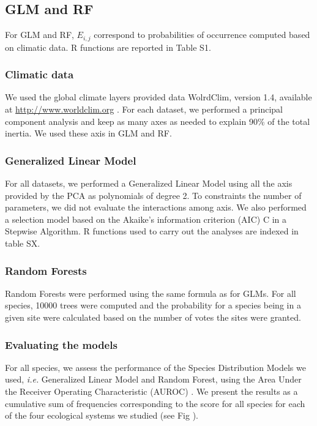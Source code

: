 \subsection{GLM and RF}\label{glm-and-rf}

For GLM and RF, \(E_{i,j}\) correspond to probabilities of occurrence
computed based on climatic data. R functions are reported in Table S1.

\subsubsection{Climatic data}\label{climatic-data}

We used the global climate layers provided data WolrdClim, version 1.4,
available at \url{http://www.worldclim.org} \citep{Hijmans2005}. For
each dataset, we performed a principal component analysis and keep as
many axes as needed to explain 90\% of the total inertia. We used these
axis in GLM and RF.

\subsubsection{Generalized Linear Model}\label{generalized-linear-model}

For all datasets, we performed a Generalized Linear Model
\citep{Elith2006} using all the axis provided by the PCA as polynomials
of degree 2. To constraints the number of parameters, we did not
evaluate the interactions among axis. We also performed a selection
model based on the Akaike's information criterion (AIC) C in a Stepwise
Algorithm. R functions used to carry out the analyses are indexed in
table SX.

\subsubsection{Random Forests}\label{random-forests}

Random Forests \citep{Prasad2006} were performed using the same formula
as for GLMs. For all species, 10000 trees were computed and the
probability for a species being in a given site were calculated based on
the number of votes the sites were granted.

\subsubsection{Evaluating the models}\label{evaluating-the-models}

For all species, we assess the performance of the Species Distribution
Models we used, \emph{i.e.} Generalized Linear Model and Random Forest,
using the Area Under the Receiver Operating Characteristic (AUROC)
\citep{Elith2006}. We present the results as a cumulative sum of
frequencies corresponding to the score for all species for each of the
four ecological systems we studied (see Fig \citet{fig:idauc}).

